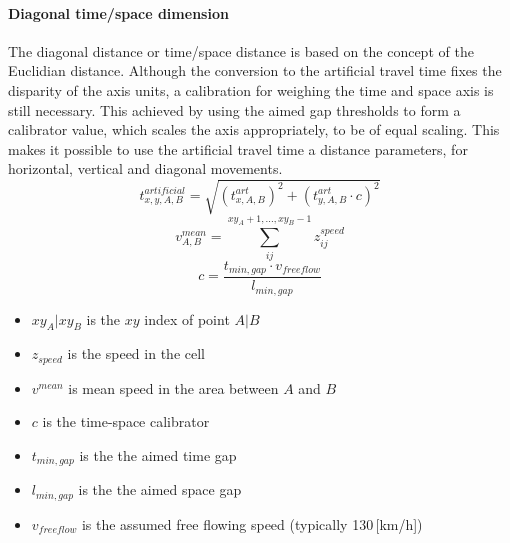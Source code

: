 \paragraph{Diagonal time/space dimension} The diagonal distance or time/space distance is based on the concept of the Euclidian distance. Although the conversion to the artificial travel time fixes the disparity of the axis units, a calibration for weighing the time and space axis is still necessary. This achieved by using the aimed gap thresholds to form a calibrator value, which scales the axis appropriately, to be of equal scaling. This makes it possible to use the artificial travel time a distance parameters, for horizontal, vertical and diagonal movements.
\begin{equation}
	t_{x,y,A,B}^{artificial} = \sqrt{(t_{x,A,B}^{art})^2 + (t_{y,A,B}^{art} \cdot c)^2}
\end{equation}
\begin{equation}
	v_{A,B}^{mean} = \sum_{ij}^{xy_A + 1,...,xy_B - 1} z_{ij}^{speed}
\end{equation}
\begin{equation}
	c = \frac{t_{min,gap} \cdot v_{freeflow}}{l_{min,gap}}
\end{equation}
\begin{itemize}
	\setlength\itemsep{0.1em}	
	\item[] $xy_A | xy_B$ is the $xy$ index of point $A | B$
	\item[] $z_{speed}$ is the speed in the cell
	\item[] $v^{mean}$ is mean speed in the area between $A$ and $B$
	\item[] $c$ is the time-space calibrator
	\item[] $t_{min,gap}$ is the the aimed time gap
	\item[] $l_{min,gap}$ is the the aimed space gap
	\item[] $v_{freeflow}$ is the assumed free flowing speed (typically 130\,[km/h])
\end{itemize}

